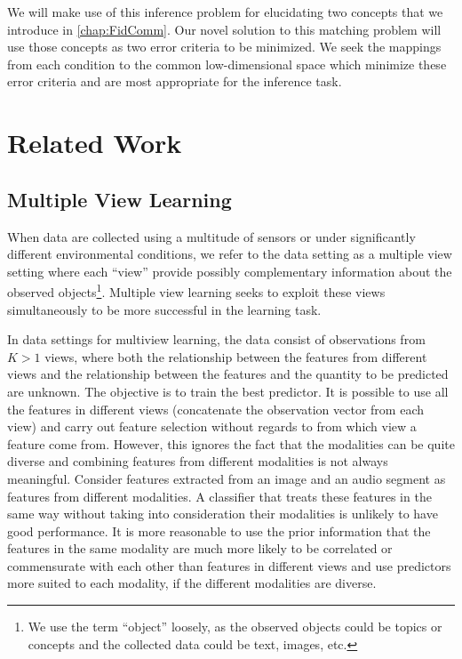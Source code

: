 \documentclass[12pt,oneside,final]{thesis}\usepackage[]{graphicx}\usepackage[]{color}
\begin{document}
We will make use of this inference problem for elucidating two concepts that we introduce  in \autoref{chap:FidComm}. Our novel solution to this matching problem will use those concepts as two error criteria to be minimized. We seek the mappings from each condition to the common low-dimensional space which  minimize these error criteria and are  most appropriate for the inference task.




\chapter{Related Work}
\label{chap:RelatedWork}



\section{Multiple View Learning}
\label{sec:MultiViewLearn}
When data are collected using a multitude of sensors or under significantly different environmental conditions, we refer to  the data setting as a multiple view setting where each ``view'' provide possibly complementary  information about the observed objects\footnote{We use the term ``object''  loosely, as the observed objects could be topics or concepts and the  collected data could be text, images, etc.}. Multiple view learning seeks to exploit these views simultaneously to be more successful in the learning task.

In data settings for multiview learning, the data consist of observations from $K>1$ views, where both the relationship between the features from different views and the relationship between the features and the quantity to be predicted are unknown. The objective is to train the best predictor. It is possible to use all the features in different views (\ie concatenate the observation vector from each view)  and carry out feature selection without regards to from which view a feature come from. However, this ignores the fact that the modalities can be quite diverse and combining features from different modalities is not always meaningful. Consider features extracted from an image  and an audio segment as features from different modalities. A classifier that treats these features in the same way without taking into consideration their modalities is  unlikely to have good performance.
It is more reasonable to use the prior information that the features in the same modality are much more likely to be correlated or commensurate with each other than features in different views and use predictors more suited to each modality, if the different modalities are diverse.
\end{document}
